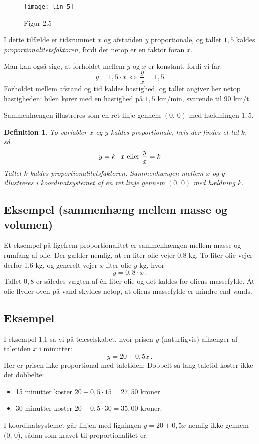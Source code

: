 \documentclass[12pt,oneside,a4paper]{article}
\newtheorem{mydef}[thm]{Definition}
\begin{document}
\begin{figure}[H]
    \centering
    \texttt{[image: lin-5]}
    \caption{Figur 2.5}
    \label{fig36}
\end{figure}

I dette tilfælde er tidsrummet $x$ og afstanden $y$ proportionale, og tallet
$1,5$ kaldes {\em proportionalitetsfaktoren}, fordi det netop er en faktor foran $x$.

Man kan også sige, at forholdet mellem $y$ og $x$ er konstant, fordi vi får:
\[
y = 1,5\cdot x \, \Leftrightarrow \, \frac{y}{x} = 1,5
\]
Forholdet mellem afstand og tid kaldes hastighed, og tallet angiver her netop
hastigheden: bilen kører med en hastighed på $1,5$ km/min, svarende til $90$
km/t.

Sammenhængen illustreres som en ret linje gennem $(0,\,0)$ med hældningen $1,5$.

\begin{mydef}
    To variabler $x$ og $y$ kaldes proportionale, hvis der findes et tal $k$, så
    $$
    y = k\cdot x \,\, {\rm eller} \,\, \frac{y}{x} = k
    $$
    Tallet $k$ kaldes proportionalitetsfaktoren. Sammenhængen mellem $x$ og $y$
    illustreres i koordinatsystemet af en ret linje gennem $(0,\,0)$ med 
    hældning $k$.
\end{mydef}

\subsection{Eksempel (sammenhæng mellem masse og volumen)}

Et eksempel på ligefrem proportionalitet er sammenhængen mellem masse og rumfang af olie.
Der gælder nemlig, at en liter olie vejer 0,8 kg. To liter olie vejer derfor 1,6 kg,
og generelt vejer $x$ liter olie $y$ kg, hvor
\[
y = 0,8 \cdot x \,.
\]
Tallet $0,8$ er således vægten af én liter olie og det kaldes for oliens
massefylde.  At olie flyder oven på vand skyldes netop, at oliens massefylde er
mindre end vands.

\subsection{Eksempel}
I eksempel 1.1 så vi på teleselskabet, hvor prisen $y$ (naturligvis) afhænger af
taletiden $x$ i minutter:
\[
y=20+0,5x \,.
\]
Her er prisen ikke proportional med taletiden: Dobbelt så lang taletid koster ikke
det dobbelte:
\begin{itemize}
    \item 15 minutter koster $20+0,5\cdot 15 = 27,50$ kroner.
    \item 30 minutter koster $20+0,5\cdot 30 = 35,00$ kroner.
\end{itemize}
I koordinatsystemet går linjen med ligningen $y=20+0,5x$ nemlig ikke gennem (0, 0),
sådan som kravet til proportionalitet er.
\end{document}
